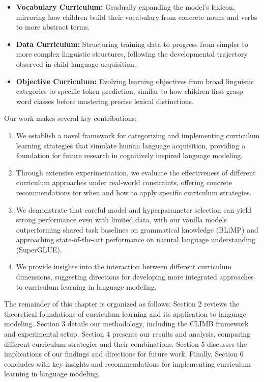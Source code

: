 \begin{itemize}
    \item \textbf{Vocabulary Curriculum:} Gradually expanding the model's lexicon, mirroring how children build their vocabulary from concrete nouns and verbs to more abstract terms.
    \item \textbf{Data Curriculum:} Structuring training data to progress from simpler to more complex linguistic structures, following the developmental trajectory observed in child language acquisition.
    \item \textbf{Objective Curriculum:} Evolving learning objectives from broad linguistic categories to specific token prediction, similar to how children first grasp word classes before mastering precise lexical distinctions.
\end{itemize}

Our work makes several key contributions:

\begin{enumerate}
    \item We establish a novel framework for categorizing and implementing curriculum learning strategies that simulate human language acquisition, providing a foundation for future research in cognitively inspired language modeling.
    
    \item Through extensive experimentation, we evaluate the effectiveness of different curriculum approaches under real-world constraints, offering concrete recommendations for when and how to apply specific curriculum strategies.
    
    \item We demonstrate that careful model and hyperparameter selection can yield strong performance even with limited data, with our vanilla models outperforming shared task baselines on grammatical knowledge (BLiMP) and approaching state-of-the-art performance on natural language understanding (SuperGLUE).
    
    \item We provide insights into the interaction between different curriculum dimensions, suggesting directions for developing more integrated approaches to curriculum learning in language modeling.
\end{enumerate}

The remainder of this chapter is organized as follows: Section 2 reviews the theoretical foundations of curriculum learning and its application to language modeling. Section 3 details our methodology, including the CLIMB framework and experimental setup. Section 4 presents our results and analysis, comparing different curriculum strategies and their combinations. Section 5 discusses the implications of our findings and directions for future work. Finally, Section 6 concludes with key insights and recommendations for implementing curriculum learning in language modeling.

